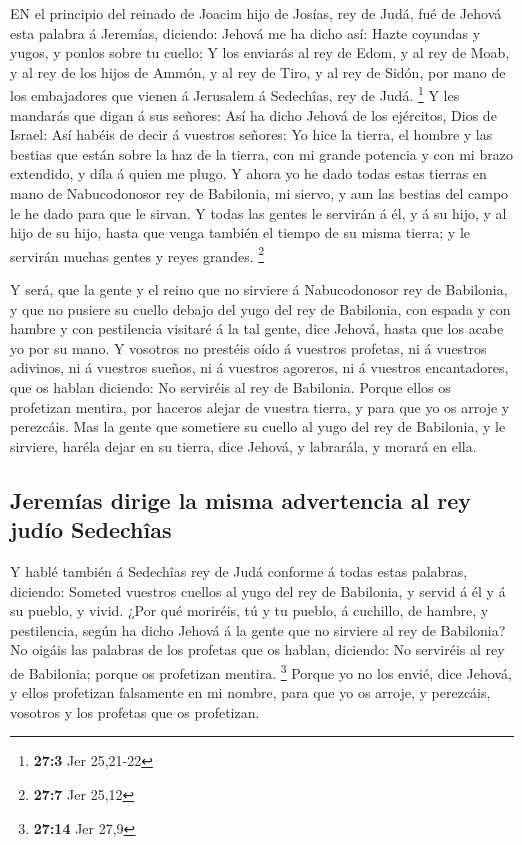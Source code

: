  EN el principio del reinado de Joacim hijo de Josías, rey
de Judá, fué de Jehová esta palabra á Jeremías, diciendo: 
Jehová me ha dicho así: Hazte coyundas y yugos, y ponlos sobre tu
cuello;  Y los enviarás al rey de Edom, y al rey de Moab, y
al rey de los hijos de Ammón, y al rey de Tiro, y al rey de Sidón, por
mano de los embajadores que vienen á Jerusalem á Sedechîas, rey de Judá.
\footnote{\textbf{27:3} Jer 25,21-22}  Y les mandarás que
digan á sus señores: Así ha dicho Jehová de los ejércitos, Dios de
Israel: Así habéis de decir á vuestros señores:  Yo hice la
tierra, el hombre y las bestias que están sobre la haz de la tierra, con
mi grande potencia y con mi brazo extendido, y díla á quien me plugo.
 Y ahora yo he dado todas estas tierras en mano de
Nabucodonosor rey de Babilonia, mi siervo, y aun las bestias del campo
le he dado para que le sirvan.  Y todas las gentes le
servirán á él, y á su hijo, y al hijo de su hijo, hasta que venga
también el tiempo de su misma tierra; y le servirán muchas gentes y
reyes grandes. \footnote{\textbf{27:7} Jer 25,12}

 Y será, que la gente y el reino que no sirviere á
Nabucodonosor rey de Babilonia, y que no pusiere su cuello debajo del
yugo del rey de Babilonia, con espada y con hambre y con pestilencia
visitaré á la tal gente, dice Jehová, hasta que los acabe yo por su
mano.  Y vosotros no prestéis oído á vuestros profetas, ni á
vuestros adivinos, ni á vuestros sueños, ni á vuestros agoreros, ni á
vuestros encantadores, que os hablan diciendo: No serviréis al rey de
Babilonia.  Porque ellos os profetizan mentira, por haceros
alejar de vuestra tierra, y para que yo os arroje y perezcáis.
 Mas la gente que sometiere su cuello al yugo del rey de
Babilonia, y le sirviere, haréla dejar en su tierra, dice Jehová, y
labrarála, y morará en ella.

\hypertarget{jeremuxedas-dirige-la-misma-advertencia-al-rey-juduxedo-sedechuxeeas}{%
\subsection{Jeremías dirige la misma advertencia al rey judío
Sedechîas}\label{jeremuxedas-dirige-la-misma-advertencia-al-rey-juduxedo-sedechuxeeas}}

 Y hablé también á Sedechîas rey de Judá conforme á todas
estas palabras, diciendo: Someted vuestros cuellos al yugo del rey de
Babilonia, y servid á él y á su pueblo, y vivid.  ¿Por qué
moriréis, tú y tu pueblo, á cuchillo, de hambre, y pestilencia, según ha
dicho Jehová á la gente que no sirviere al rey de Babilonia?
 No oigáis las palabras de los profetas que os hablan,
diciendo: No serviréis al rey de Babilonia; porque os profetizan
mentira. \footnote{\textbf{27:14} Jer 27,9}  Porque yo no
los envié, dice Jehová, y ellos profetizan falsamente en mi nombre, para
que yo os arroje, y perezcáis, vosotros y los profetas que os
profetizan.

